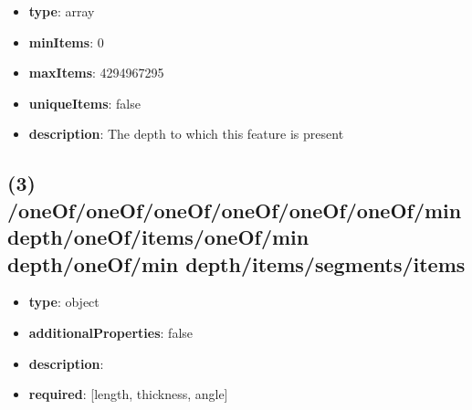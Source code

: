 \begin{itemize}[leftmargin=2em]\item {\bf type}: array
\item {\bf minItems}: 0
\item {\bf maxItems}: 4294967295
\item {\bf uniqueItems}: false
\item {\bf description}: The depth to which this feature is present
\end{itemize}\subsection{(3) /oneOf/oneOf/oneOf/oneOf/oneOf/oneOf/min depth/oneOf/items/oneOf/min depth/oneOf/min depth/items/segments/items}
\begin{itemize}[leftmargin=3em]\item {\bf type}: object
\item {\bf additionalProperties}: false
\item {\bf description}: 
\item {\bf required}: [length, thickness, angle]\end{itemize}
